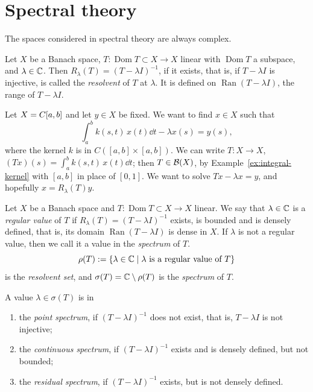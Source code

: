 \section{Spectral theory}

\begin{remark}
The spaces considered in spectral theory are always complex.
\end{remark}

\begin{definition}[Resolvent]\label{def:resolvent}
Let $X$ be a Banach space, $T \colon \operatorname{Dom} T \subset X \to X$
linear with $\operatorname{Dom} T$ a subspace, and $\lambda \in \mathbb{C}$. Then
$R_\lambda(T) = (T - \lambda I)^{-1}$, if it exists, that is, if
$T - \lambda I$ is injective, is called the \emph{resolvent} of $T$ at
$\lambda$. It is defined on $\operatorname{Ran}(T - \lambda I)$, the range of
$T - \lambda I$.
\end{definition}

\begin{example}
Let $X = C[a,b]$ and let $y \in X$ be fixed. We want to find $x \in X$
such that
\[
  \int_a^b k(s,t)\, x(t) \dd t - \lambda x(s) = y(s) ,
\]
where the kernel $k$ is in $C([a,b] \times [a,b])$. We can write
$T \colon X \to X$, $(Tx)(s) = \int_a^b k(s,t)\, x(t) \dd t$; then
$T \in \mathcal{B}(X)$, by Example~\ref{ex:integral-kernel} with $[a,b]$ in place
of $[0,1]$. We want to solve $Tx - \lambda x = y$, and hopefully
$x = R_\lambda(T) y$.
\end{example}

\begin{definition}[Spectrum]\label{def:spectrum}
Let $X$ be a Banach space and $T \colon \operatorname{Dom} T \subset X \to X$
linear. We say that $\lambda \in \mathbb{C}$ is a \emph{regular value} of $T$ if
$R_\lambda(T) = (T - \lambda I)^{-1}$ exists, is bounded and is densely
defined, that is, its domain $\operatorname{Ran}(T - \lambda I)$ is dense in
$X$. If $\lambda$ is not a regular value, then we call it a value in the
\emph{spectrum} of $T$.
\[
  \rho(T) := \{\lambda \in \mathbb{C} \mid \lambda \text{ is a regular value of }
  T\}
\]
is the \emph{resolvent set}, and $\sigma(T) = \mathbb{C} \setminus \rho(T)$ is the
\emph{spectrum} of $T$.
\end{definition}

\begin{definition}\label{def:spectrum-parts}
A value $\lambda \in \sigma(T)$ is in
\begin{enumerate}
  \item the \emph{point spectrum}, if $(T - \lambda I)^{-1}$ does not exist,
    that is, $T - \lambda I$ is not injective;
  \item the \emph{continuous spectrum}, if $(T - \lambda I)^{-1}$ exists and
    is densely defined, but not bounded;
  \item the \emph{residual spectrum}, if $(T - \lambda I)^{-1}$ exists, but
    is not densely defined.
\end{enumerate}
\end{definition}

